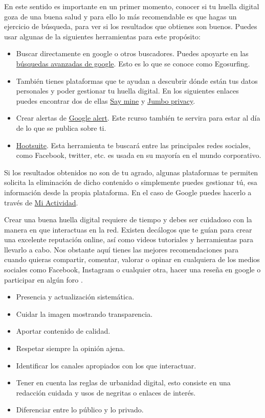 \documentclass[
  spanish,
  a4paper,
  openany]{book}
\begin{document}
En este sentido es importante en un primer momento, conocer si tu huella digital goza de una buena salud y para ello lo más recomendable es que hagas un ejercicio de búsqueda, para ver si los resultados que obtienes son buenos. Puedes usar algunas de la siguientes herramientas para este propósito:

\begin{itemize}
\item
  Buscar directamente en google o otros buscadores. Puedes apoyarte en las \href{https://support.google.com/websearch/answer/2466433?hl=es}{búsquedas avanzadas de google}. Esto es lo que se conoce como Egosurfing.
\item
  También tienes plataformas que te ayudan a descubrir dónde están tus datos personales y poder gestionar tu huella digital. En los siguientes enlaces puedes encontrar dos de ellas \href{https://saymine.com/}{Say mine} y \href{https://www.jumboprivacy.com/}{Jumbo privacy}.
\item
  Crear alertas de \href{https://www.google.es/alerts}{Google alert}. Este rcurso también te servira para estar al día de lo que se publica sobre ti.
\item
  \href{https://www.hootsuite.com/}{Hootsuite}. Esta herramienta te buscará entre las principales redes sociales, como Facebook, twitter, etc. es usada en su mayoría en el mundo corporativo.
\end{itemize}

Si los resultados obtenidos no son de tu agrado, algunas plataformas te permiten solicita la eliminación de dicho contenido o simplemente puedes gestionar tú, esa información desde la propia plataforma. En el caso de Google puedes hacerlo a través de \href{https://myactivity.google.com/myactivity}{Mi Actividad}.

Crear una buena huella digital requiere de tiempo y debes ser cuidadoso con la manera en que interactuas en la red. Existen decálogos que te guían para crear una excelente reputación online, así como videos tutoriales y herramientas para llevarlo a cabo. Nos obstante aquí tienes las mejores recomendaciones para cuando quieras compartir, comentar, valorar o opinar en cualquiera de los medios sociales como Facebook, Instagram o cualquier otra, hacer una reseña en google o participar en algún foro \citep{decalogo-digital}.

\begin{itemize}
\item
  Presencia y actualización sistemática.
\item
  Cuidar la imagen mostrando transparencia.
\item
  Aportar contenido de calidad.
\item
  Respetar siempre la opinión ajena.
\item
  Identificar los canales apropiados con los que interactuar.
\item
  Tener en cuenta las reglas de urbanidad digital, esto consiste en una redacción cuidada y usos de negritas o enlaces de interés.
\item
  Diferenciar entre lo público y lo privado.
\end{itemize}
\end{document}
